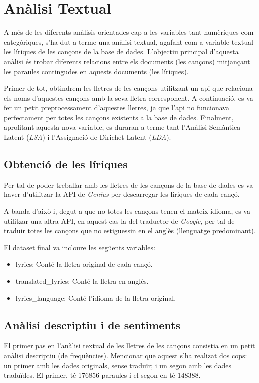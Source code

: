 \section{Anàlisi Textual}

A més de les diferents anàlisis orientades cap a les variables tant numèriques com categòriques, s'ha dut a terme una anàlisi textual, agafant com a variable textual les líriques de les cançons de la base de dades. L'objectiu principal d'aquesta anàlisi és trobar diferents relacions entre els documents (les cançons) mitjançant les paraules contingudes en aquests documents (les líriques).

Primer de tot, obtindrem les lletres de les cançons utilitzant un api que relaciona els noms d'aquestes cançons amb la seva lletra corresponent. A continuació, es va fer un petit preprocessament d'aquestes lletres, ja que l'api no funcionava perfectament per totes les cançons existents a la base de dades. Finalment, aprofitant aquesta nova variable, es duraran a terme tant l'Anàlisi Semàntica Latent (\textit{LSA}) i l'Assignació de Dirichet Latent (\textit{LDA}).

\subsection{Obtenció de les líriques}

Per tal de poder treballar amb les lletres de les cançons de la base de dades es va haver d'utilitzar la API de \textit{Genius} per descarregar les líriques de cada cançó. 

A banda d'això i, degut a que no totes les cançons tenen el mateix idioma, es va utilitzar una altra API, en aquest cas la del traductor de \textit{Google}, per tal de traduir totes les cançons que no estiguessin en el anglès (llenguatge predominant).

El dataset final va incloure les següents variables:

\begin{itemize}
    \item lyrics: Conté la lletra original de cada cançó.
    \item translated\_lyrics: Conté la lletra en anglès.
    \item lyrics\_language: Conté l'idioma de la lletra original.
\end{itemize}

\subsection{Anàlisi descriptiu i de sentiments}
El primer pas en l'anàlisi textual de les lletres de les cançons consistia en un petit anàlisi descriptiu (de freqüències). Mencionar que aquest s'ha realizat dos cops: un primer amb les dades originals, sense traduïr; i un segon amb les dades traduïdes. El primer, té 176856 paraules i el segon en té 148388.

